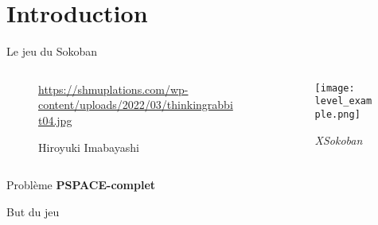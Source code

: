 



    \maketitle

    \section{Introduction}
        \begin{frame}{Le jeu du Sokoban}
            \begin{columns}[onlytextwidth]
                \begin{column}{0.32\textwidth}
                    \begin{figure}
                        \centering
                                        {\url{https://shmuplations.com/wp-content/uploads/2022/03/thinkingrabbit04.jpg}}%
                        \caption*{Hiroyuki Imabayashi}
                    \end{figure}
                \end{column}
                \begin{column}{0.6\textwidth}
                    \begin{figure}
                        \centering
                        \texttt{[image: level\_example.png]}
                        \caption*{\textit{XSokoban}}
                    \end{figure}
                \end{column}
            \end{columns}

            \centering
            Problème \textbf{PSPACE-complet}
        \end{frame}

        \begin{frame}{But du jeu}
            \centering
        \end{frame}

